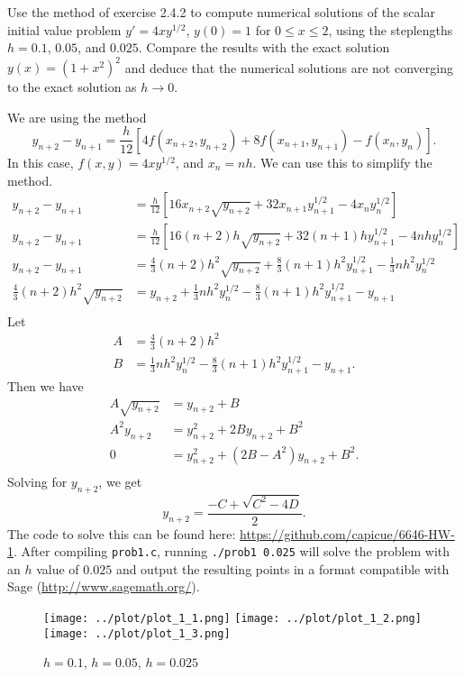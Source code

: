 \begin{problem}[L 2.4.2]
  Use the method of exercise 2.4.2 to compute numerical solutions of the scalar initial value problem $y' = 4xy^{1/2}$, $y(0) = 1$ for $0 \leq x \leq 2$, using the steplengths $h = 0.1$, $0.05$, and $0.025$. Compare the results with the exact solution $y(x) = (1 + x^2)^2$ and deduce that the numerical solutions are not converging to the exact solution as $h \to 0$.
\end{problem}

\begin{solution}
  We are using the method
  \[
    y_{n + 2} - y_{n + 1} = \frac{h}{12}\left[4 f(x_{n + 2}, y_{n + 2}) + 8 f(x_{n + 1}, y_{n + 1}) - f(x_n, y_n)\right].
  \]
  In this case, $f(x, y) = 4xy^{1/2}$, and $x_n = nh$. We can use this to simplify the method.
  \begin{align*}
    y_{n + 2} - y_{n + 1} &= \frac{h}{12}\left[16 x_{n + 2} \sqrt{y_{n + 2}} + 32 x_{n + 1} y_{n + 1}^{1/2} - 4 x_n y_n^{1/2}\right] \\
    y_{n + 2} - y_{n + 1} &= \frac{h}{12}\left[16 (n + 2) h \sqrt{y_{n + 2}} + 32 (n + 1) h y_{n + 1}^{1/2} - 4 n h y_n^{1/2}\right] \\
    y_{n + 2} - y_{n + 1} &= \frac{4}{3} (n + 2) h^2 \sqrt{y_{n + 2}} + \frac{8}{3} (n + 1) h^2 y_{n + 1}^{1/2} - \frac{1}{3} n h^2 y_n^{1/2} \\
    \frac{4}{3} (n + 2) h^2 \sqrt{y_{n + 2}} &= y_{n + 2} + \frac{1}{3} n h^2 y_n^{1/2} - \frac{8}{3} (n + 1) h^2 y_{n + 1}^{1/2} - y_{n + 1} \\
  \end{align*}
  Let
  \begin{align*}
    A &= \frac{4}{3} (n + 2) h^2 \\
    B &= \frac{1}{3} n h^2 y_n^{1/2} - \frac{8}{3} (n + 1) h^2 y_{n + 1}^{1/2} - y_{n + 1}.
  \end{align*}
  Then we have
  \begin{align*}
    A \sqrt{y_{n + 2}} &= y_{n + 2} + B \\
    A^2 y_{n + 2} &= y_{n + 2}^2 + 2 B y_{n + 2} + B^2 \\
    0 &= y_{n+2}^2 + (2B - A^2)y_{n+2} + B^2. \\
  \end{align*}
  Solving for $y_{n + 2}$, we get
  \[
    y_{n + 2} = \frac{-C + \sqrt{C^2 - 4D}}{2}.
  \]
  The code to solve this can be found here: \url{https://github.com/capicue/6646-HW-1}. After compiling \texttt{prob1.c}, running \texttt{./prob1 0.025} will solve the problem with an $h$ value of $0.025$ and output the resulting points in a format compatible with Sage (\url{http://www.sagemath.org/}).
  
  \begin{figure}[!ht]
    \centering
    \texttt{[image: ../plot/plot\_1\_1.png]}
    \texttt{[image: ../plot/plot\_1\_2.png]}
    \texttt{[image: ../plot/plot\_1\_3.png]}
    \caption{$h = 0.1$, $h = 0.05$, $h = 0.025$}
    \label{fig:prob1}
  \end{figure}
\end{solution}
